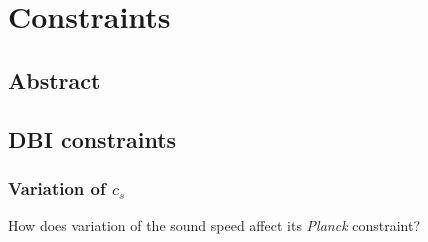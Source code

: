 %
\chapter{Constraints}
\section{Abstract}\label{sec:constraints_abstract}
\section{DBI constraints}\label{sec:dbi_constraints}
\subsection{Variation of $c_s$}
How does variation of the sound speed affect its \textit{Planck} constraint?

